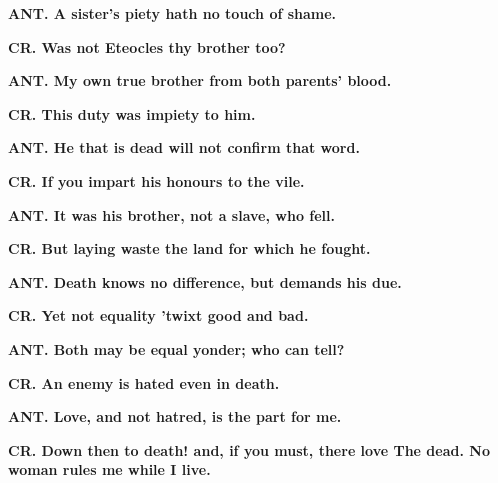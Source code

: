\documentclass[11pt,letter]{book}
\begin{document}
\par \textbf{ANT. A sister’s piety hath no touch of shame.}
\par 

\par \textbf{CR. Was not Eteocles thy brother too?}
\par 

\par \textbf{ANT. My own true brother from both parents’ blood.}
\par 

\par \textbf{CR. This duty was impiety to him.}
\par 

\par \textbf{ANT. He that is dead will not confirm that word.}
\par 

\par \textbf{CR. If you impart his honours to the vile.}
\par 

\par \textbf{ANT. It was his brother, not a slave, who fell.}
\par 

\par \textbf{CR. But laying waste the land for which he fought.}
\par 

\par \textbf{ANT. Death knows no difference, but demands his due.}
\par 

\par \textbf{CR. Yet not equality ’twixt good and bad.}
\par 

\par \textbf{ANT. Both may be equal yonder; who can tell?}
\par 

\par \textbf{CR. An enemy is hated even in death.}
\par 

\par \textbf{ANT. Love, and not hatred, is the part for me.}
\par 

\par \textbf{CR. Down then to death! and, if you must, there love The dead. No woman rules me while I live.}
\par 
\end{document}
